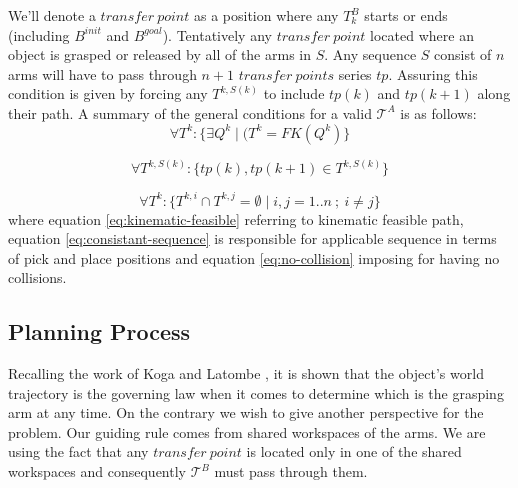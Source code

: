 We'll denote a $transfer~point$ as a position where any $T^B_k$ starts or ends (including $B^{init}$ and $B^{goal}$). Tentatively any $transfer~point$ located where an object is grasped or released by all of the arms in $S$. Any sequence $S$ consist of $n$ arms will have to pass through $n+1$ $transfer~points$ series $tp$. Assuring this condition is given by forcing any $T^{k,S(k)}$ to include $tp(k)$ and $tp(k+1)$ along their path. A summary of the general conditions for a valid $\mathcal{T}^A$ is as follows:
\begin{equation}
\label{eq:kinematic-feasible}
        \forall T^{k}: \{\exists Q^{k} \mid (T^{k} = FK(Q^{k})\} 
\end{equation}

\begin{equation}
\label{eq:consistant-sequence}
        \forall T^{k,S(k)}: \{ tp(k),tp(k+1) \in T^{k,S(k)}  \}
\end{equation}

\begin{equation}
\label{eq:no-collision}
        \forall T^{k}: \{ T^{k,i} \cap T^{k,j} = \emptyset \mid i,j=1..n~;~i\neq j \}
\end{equation}
where equation \ref{eq:kinematic-feasible} referring to kinematic feasible path, equation \ref{eq:consistant-sequence} is responsible for applicable sequence in terms of pick and place positions and equation \ref{eq:no-collision} imposing for having no collisions.





\subsection{Planning Process}
Recalling the work of Koga and Latombe \cite{koga1994multi}, it is shown that the object's world trajectory is the governing law when it comes to determine which is the grasping arm at any time. On the contrary we wish to give another perspective for the problem. Our guiding rule comes from shared workspaces of the arms. We are using the fact that any $transfer~point$ is located only in one of the shared workspaces and consequently $\mathcal{T}^B$ must pass through them. 

